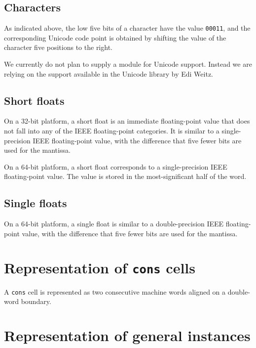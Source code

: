 \subsection{Characters}

As indicated above, the low five bits of a character have the value
\texttt{00011}, and the corresponding Unicode code point is obtained by
shifting the value of the character five positions to the right.

We currently do not plan to supply a module for Unicode support.
Instead we are relying on the support available in the Unicode library
by Edi Weitz.

\subsection{Short floats}

On a 32-bit platform, a short float is an immediate floating-point
value that does not fall into any of the IEEE floating-point
categories.  It is similar to a single-precision
IEEE floating-point value, with the difference that five fewer bits
are used for the mantissa.

On a 64-bit platform, a short float corresponds to a single-precision
IEEE floating-point value.  The value is stored in the
most-significant half of the word.

\subsection{Single floats}

On a 64-bit platform, a single float is similar to a double-precision
IEEE floating-point value, with the difference that five fewer bits
are used for the mantissa.

\section{Representation of \texttt{cons} cells}

A \texttt{cons} cell is represented as two consecutive machine
words aligned on a double-word boundary.

\section{Representation of general instances}
\label{sec-data-representation-general-instances}

